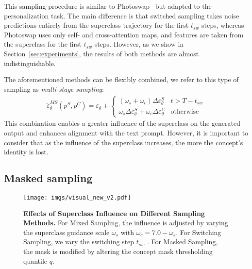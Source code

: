This sampling procedure is similar to Photoswap~\cite{photoswap} but adapted to the personalization task. The main difference is that switched sampling takes noise predictions entirely from the superclass trajectory for the first $t_{sw}$ steps, whereas Photoswap uses only self- and cross-attention maps, and features are taken from the superclass for the first $t_{sw}$ steps. However, as we show in Section~\ref{sec:experiments}, the results of both methods are almost indistinguishable.

The aforementioned methods can be flexibly combined, we refer to this type of sampling as \textit{multi-stage sampling}:
\begin{align}\label{eq:multistage_sampling}
\tilde{\varepsilon}^{MS}_{\theta}(p^S, p^C) = \varepsilon_{\theta} +
    \begin{cases}
         (\omega_s + \omega_c)\Delta\varepsilon_{\theta}^{S} &t > T - t_{sw}\\[-0pt]
         \omega_s \Delta\varepsilon_{\theta}^{S} + \omega_c\Delta\varepsilon_{\theta}^{C}&\text{otherwise}
    \end{cases}
\end{align}
This combination enables a greater influence of the superclass on the generated output and enhances alignment with the text prompt. However, it is important to consider that as the influence of the superclass increases, the more the concept's identity is lost.

\subsection{Masked sampling}

\begin{figure*}[t!]
  \centering
  \texttt{[image: imgs/visual\_new\_v2.pdf]}
  \vspace{-0.19in}
  \caption{\textbf{Effects of Superclass Influence on Different Sampling Methods.} 
  For Mixed Sampling, the influence is adjusted by varying the superclass guidance scale $\omega_s$ with $\omega_c = 7.0 - \omega_s$. For Switching Sampling, we vary the switching step $t_{sw}$ . For Masked Sampling, the mask is modified by altering the concept mask thresholding quantile $q$.
  }
  \label{fig:visual}
  \vspace{-0.19in}
\end{figure*}


